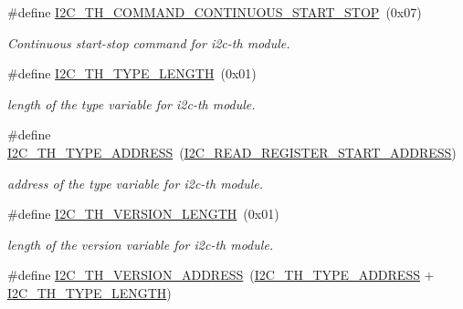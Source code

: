 \begin{DoxyCompactItemize}
\mbox{\label{registers-th_8h_a21a1375a228e3e8aa42a0d5a63b0525d}} 
\#define \hyperlink{registers-th_8h_a21a1375a228e3e8aa42a0d5a63b0525d}{I2\+C\+\_\+\+T\+H\+\_\+\+C\+O\+M\+M\+A\+N\+D\+\_\+\+C\+O\+N\+T\+I\+N\+U\+O\+U\+S\+\_\+\+S\+T\+A\+R\+T\+\_\+\+S\+T\+OP}~(0x07)
\begin{DoxyCompactList}\small\item\em Continuous start-\/stop command for i2c-\/th module. \end{DoxyCompactList}\item 
\mbox{\label{registers-th_8h_a0cbb42c5d740febc30ebacafc0fe92f9}} 
\#define \hyperlink{registers-th_8h_a0cbb42c5d740febc30ebacafc0fe92f9}{I2\+C\+\_\+\+T\+H\+\_\+\+T\+Y\+P\+E\+\_\+\+L\+E\+N\+G\+TH}~(0x01)
\begin{DoxyCompactList}\small\item\em length of the type variable for i2c-\/th module. \end{DoxyCompactList}\item 
\mbox{\label{registers-th_8h_ae0b56541b450305c37323bfb723be2f7}} 
\#define \hyperlink{registers-th_8h_ae0b56541b450305c37323bfb723be2f7}{I2\+C\+\_\+\+T\+H\+\_\+\+T\+Y\+P\+E\+\_\+\+A\+D\+D\+R\+E\+SS}~(\hyperlink{registers_8h_ad04d1b7c138bbfcc7672f00defb5f312}{I2\+C\+\_\+\+R\+E\+A\+D\+\_\+\+R\+E\+G\+I\+S\+T\+E\+R\+\_\+\+S\+T\+A\+R\+T\+\_\+\+A\+D\+D\+R\+E\+SS})
\begin{DoxyCompactList}\small\item\em address of the type variable for i2c-\/th module. \end{DoxyCompactList}\item 
\mbox{\label{registers-th_8h_ae5c39794517db2f849788f74d0f5d71a}} 
\#define \hyperlink{registers-th_8h_ae5c39794517db2f849788f74d0f5d71a}{I2\+C\+\_\+\+T\+H\+\_\+\+V\+E\+R\+S\+I\+O\+N\+\_\+\+L\+E\+N\+G\+TH}~(0x01)
\begin{DoxyCompactList}\small\item\em length of the version variable for i2c-\/th module. \end{DoxyCompactList}\item 
\mbox{\label{registers-th_8h_a264c5b05353c735ad1d5d91550b12cc7}} 
\#define \hyperlink{registers-th_8h_a264c5b05353c735ad1d5d91550b12cc7}{I2\+C\+\_\+\+T\+H\+\_\+\+V\+E\+R\+S\+I\+O\+N\+\_\+\+A\+D\+D\+R\+E\+SS}~(\hyperlink{registers-th_8h_ae0b56541b450305c37323bfb723be2f7}{I2\+C\+\_\+\+T\+H\+\_\+\+T\+Y\+P\+E\+\_\+\+A\+D\+D\+R\+E\+SS} + \hyperlink{registers-th_8h_a0cbb42c5d740febc30ebacafc0fe92f9}{I2\+C\+\_\+\+T\+H\+\_\+\+T\+Y\+P\+E\+\_\+\+L\+E\+N\+G\+TH})

\end{DoxyCompactItemize}
